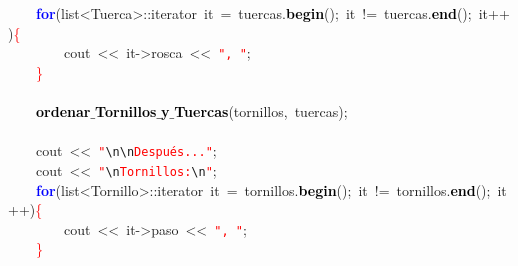\mbox{}\ \ \ \ \textbf{\textcolor{Blue}{for}}\textcolor{BrickRed}{(}list\textcolor{BrickRed}{\textless{}}Tuerca\textcolor{BrickRed}{\textgreater{}::}\textcolor{TealBlue}{iterator}\ it\ \textcolor{BrickRed}{=}\ tuercas\textcolor{BrickRed}{.}\textbf{\textcolor{Black}{begin}}\textcolor{BrickRed}{();}\ it\ \textcolor{BrickRed}{!=}\ tuercas\textcolor{BrickRed}{.}\textbf{\textcolor{Black}{end}}\textcolor{BrickRed}{();}\ it\textcolor{BrickRed}{++)}\textcolor{Red}{\{} \\
\mbox{}\ \ \ \ \ \ \ \ cout\ \textcolor{BrickRed}{\textless{}\textless{}}\ it\textcolor{BrickRed}{-\textgreater{}}rosca\ \textcolor{BrickRed}{\textless{}\textless{}}\ \texttt{\textcolor{Red}{"{},\ "{}}}\textcolor{BrickRed}{;} \\
\mbox{}\ \ \ \ \textcolor{Red}{\}}\ \ \ \  \\
\mbox{} \\
\mbox{}\ \ \ \ \textbf{\textcolor{Black}{ordenar$\_$Tornillos$\_$y$\_$Tuercas}}\textcolor{BrickRed}{(}tornillos\textcolor{BrickRed}{,}\ tuercas\textcolor{BrickRed}{);} \\
\mbox{} \\
\mbox{}\ \ \ \ cout\ \textcolor{BrickRed}{\textless{}\textless{}}\ \texttt{\textcolor{Red}{"{}}}\texttt{\textcolor{CarnationPink}{\textbackslash{}n\textbackslash{}n}}\texttt{\textcolor{Red}{Después..."{}}}\textcolor{BrickRed}{;} \\
\mbox{}\ \ \ \ cout\ \textcolor{BrickRed}{\textless{}\textless{}}\ \texttt{\textcolor{Red}{"{}}}\texttt{\textcolor{CarnationPink}{\textbackslash{}n}}\texttt{\textcolor{Red}{Tornillos:}}\texttt{\textcolor{CarnationPink}{\textbackslash{}n}}\texttt{\textcolor{Red}{"{}}}\textcolor{BrickRed}{;} \\
\mbox{}\ \ \ \ \textbf{\textcolor{Blue}{for}}\textcolor{BrickRed}{(}list\textcolor{BrickRed}{\textless{}}Tornillo\textcolor{BrickRed}{\textgreater{}::}\textcolor{TealBlue}{iterator}\ it\ \textcolor{BrickRed}{=}\ tornillos\textcolor{BrickRed}{.}\textbf{\textcolor{Black}{begin}}\textcolor{BrickRed}{();}\ it\ \textcolor{BrickRed}{!=}\ tornillos\textcolor{BrickRed}{.}\textbf{\textcolor{Black}{end}}\textcolor{BrickRed}{();}\ it\textcolor{BrickRed}{++)}\textcolor{Red}{\{} \\
\mbox{}\ \ \ \ \ \ \ \ cout\ \textcolor{BrickRed}{\textless{}\textless{}}\ it\textcolor{BrickRed}{-\textgreater{}}paso\ \textcolor{BrickRed}{\textless{}\textless{}}\ \texttt{\textcolor{Red}{"{},\ "{}}}\textcolor{BrickRed}{;} \\
\mbox{}\ \ \ \ \textcolor{Red}{\}} \\
